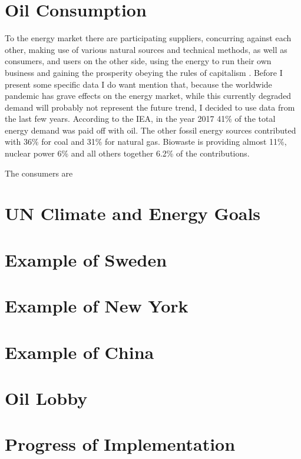 \section{Oil Consumption}
To the energy market there are participating suppliers, concurring against each other, 
making use of various natural sources and technical methods, as well as consumers, and users on the other
side, using the energy to run their own business and gaining the prosperity obeying the rules of capitalism \cite{capitalism}.
Before I present some specific data I do want mention that, because the worldwide pandemic has grave effects on the energy market, 
while this currently degraded demand \cite{IEAApril} will probably not represent the future trend, 
I decided to use data from the last few years.
According to the IEA, in the year 2017 41\% of the total energy demand was paid off with oil.
The other fossil energy sources contributed with 36\% for coal and 31\% for natural gas. 
Biowaste is providing almost 11\%, nuclear power 6\% and all others together 6.2\% of the contributions\cite{WEO_P_C}.\par
The consumers are 





\cite{Industries}


\section{UN Climate and Energy Goals}
\cite{WEO}
\cite{Algae}
\section{Example of Sweden}
\cite{Sweden}
\section{Example of New York}
\cite{NYPlans}
\cite{NYPlan2}
\section{Example of China}
\cite{ChinaEvol}
\cite{ChinaCrit}
\section{Oil Lobby}
\section{Progress of Implementation}
\cite{NYT1}


